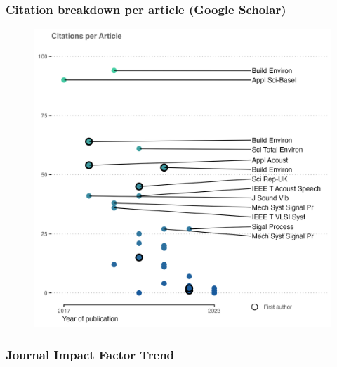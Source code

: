 \documentclass[
]{report}
\begin{document}
\hypertarget{citation-pic}{}
\hypertarget{citation-breakdown-per-article-google-scholar}{%
\subsubsection{Citation breakdown per article (Google
Scholar)}\label{citation-breakdown-per-article-google-scholar}}

\begin{figure}

{\centering \includegraphics{images/citationsPerArticle.png}

}

\end{figure}

\hypertarget{citation-pic}{}
\hypertarget{journal-impact-factor-trend}{%
\subsubsection{Journal Impact Factor
Trend}\label{journal-impact-factor-trend}}
\end{document}
